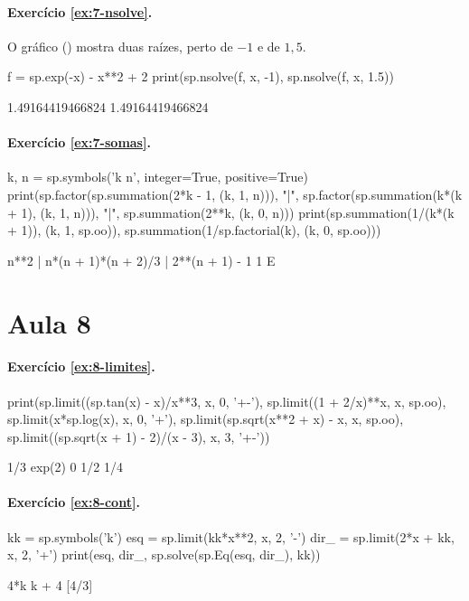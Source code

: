 \paragraph{Exercício \ref{ex:7-nsolve}.} O gráfico () mostra duas
raízes, perto de $-1$ e de $1{,}5$.
\begin{entrada}
f = sp.exp(-x) - x**2 + 2
print(sp.nsolve(f, x, -1), sp.nsolve(f, x, 1.5))
\end{entrada}
\begin{saida}
1.49164419466824 1.49164419466824
\end{saida}

\paragraph{Exercício \ref{ex:7-somas}.}
\begin{entrada}
k, n = sp.symbols('k n', integer=True, positive=True)
print(sp.factor(sp.summation(2*k - 1, (k, 1, n))), "|", sp.factor(sp.summation(k*(k + 1), (k, 1, n))),
      "|", sp.summation(2**k, (k, 0, n)))
print(sp.summation(1/(k*(k + 1)), (k, 1, sp.oo)), sp.summation(1/sp.factorial(k), (k, 0, sp.oo)))
\end{entrada}
\begin{saida}
n**2 | n*(n + 1)*(n + 2)/3 | 2**(n + 1) - 1
1 E
\end{saida}

\section*{Aula 8}

\paragraph{Exercício \ref{ex:8-limites}.}
\begin{entrada}
print(sp.limit((sp.tan(x) - x)/x**3, x, 0, '+-'),
      sp.limit((1 + 2/x)**x, x, sp.oo),
      sp.limit(x*sp.log(x), x, 0, '+'),
      sp.limit(sp.sqrt(x**2 + x) - x, x, sp.oo),
      sp.limit((sp.sqrt(x + 1) - 2)/(x - 3), x, 3, '+-'))
\end{entrada}
\begin{saida}
1/3 exp(2) 0 1/2 1/4
\end{saida}

\paragraph{Exercício \ref{ex:8-cont}.}
\begin{entrada}
kk = sp.symbols('k')
esq = sp.limit(kk*x**2, x, 2, '-')
dir_ = sp.limit(2*x + kk, x, 2, '+')
print(esq, dir_, sp.solve(sp.Eq(esq, dir_), kk))
\end{entrada}
\begin{saida}
4*k k + 4 [4/3]
\end{saida}

